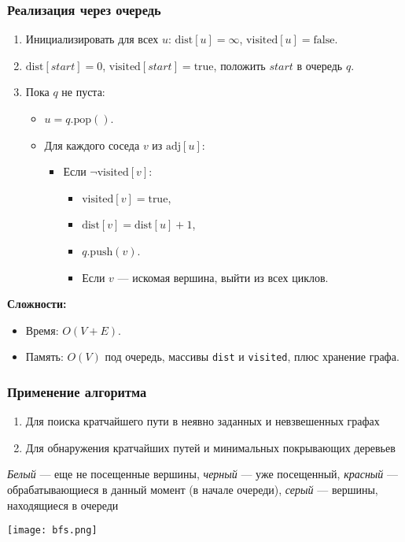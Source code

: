 \documentclass[a4paper]{article}
\begin{document}
\subsubsection*{Реализация через очередь}
\begin{enumerate}
  \item Инициализировать для всех $u$: $\text{dist}[u]=\infty$, $\text{visited}[u]=\text{false}$.
  \item $\text{dist}[start]=0$, $\text{visited}[start]=\text{true}$, положить $start$ в очередь $q$.
  \item Пока $q$ не пуста:
    \begin{itemize}
      \item $u = q.\text{pop}()$.
      \item Для каждого соседа $v$ из $\mathrm{adj}[u]$:
        \begin{itemize}
          \item Если $\neg\text{visited}[v]$:
            \begin{itemize}
              \item $\text{visited}[v]=\text{true}$,
              \item $\text{dist}[v]=\text{dist}[u]+1$,
              \item $q.\text{push}(v)$.
              \item Если $v$ — искомая вершина, выйти из всех циклов.
            \end{itemize}
        \end{itemize}
    \end{itemize}
\end{enumerate}

\textbf{Сложности:}
\begin{itemize}
  \item Время: $O(V + E)$.
  \item Память: $O(V)$ под очередь, массивы \texttt{dist} и \texttt{visited}, плюс хранение графа.
\end{itemize}

\subsubsection*{Применение алгоритма}
\begin{enumerate}
    \item Для поиска кратчайшего пути в неявно заданных и невзвешенных графах
    \item Для обнаружения кратчайших путей и минимальных покрывающих деревьев
\end{enumerate}
\indent \textit{Белый} — еще не посещенные вершины, \textit{черный} — уже посещенный, \textit{красный} — обрабатывающиеся в данный момент (в начале очереди), \textit{серый} — вершины, находящиеся в очереди
\begin{center}
    \texttt{[image: bfs.png]}
    \label{bfs}
\end{center}
\end{document}
